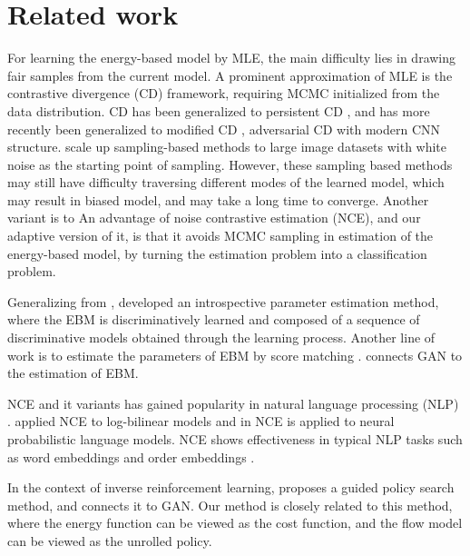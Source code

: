 \documentclass[10pt,twocolumn,letterpaper]{article}
\begin{document}
\section{Related work}
For learning the energy-based model by MLE, the main difficulty lies in drawing fair samples from the current model. A prominent approximation of MLE is the contrastive divergence (CD) \cite{hinton2002training} framework, requiring MCMC initialized from the data distribution. CD has been generalized to persistent CD \cite{tieleman2008training}, and has more recently been generalized to modified CD \cite{gao2018learning}, adversarial CD \cite{kim2016deep, dai2017calibrating, han2018divergence} with modern CNN structure. \cite{nijkamp2019learning, du2019implicit} scale up sampling-based methods to large image datasets with white noise as the starting point of sampling. However, these sampling based methods may still have difficulty traversing different modes of the learned model, which may result in biased model, and may take a long time to converge. Another variant is to  An advantage of noise contrastive estimation (NCE), and our adaptive version of it, is that it avoids MCMC sampling in estimation of the energy-based model, by turning the estimation problem into a classification problem.



Generalizing from \cite{tu2007learning}, \cite{jin2017introspective, lazarow2017introspective, lee2018wasserstein} developed an introspective parameter estimation method, where the EBM is discriminatively learned and composed of a sequence of discriminative models obtained through the learning process. Another line of work is to estimate the parameters of EBM by score matching \cite{hyvarinen2005estimation,zhai2016deep,saremi2018deep,song2019generative}. \cite{zhai2019adversarial,finn2016connection} connects GAN to the estimation of EBM. 

NCE and it variants has gained popularity in natural language processing (NLP) \cite{he2016training, oualil2017batch, baltescu2014pragmatic, bose2018adversarial}. \cite{mnih2012fast, mnih2013learning} applied NCE to log-bilinear models and in \cite{vaswani2013decoding} NCE is applied to neural probabilistic language models. NCE shows effectiveness in typical NLP tasks such as word embeddings \cite{mikolov2013distributed} and order embeddings \cite{vendrov2015order}. 

In the context of inverse reinforcement learning, \cite{levine2013guided} proposes a guided policy search method, and \cite{finn2016connection} connects it to GAN.  Our method is closely related to this method, where the energy function can be viewed as the cost function, and the flow model can be viewed as the unrolled policy. 
\end{document}
